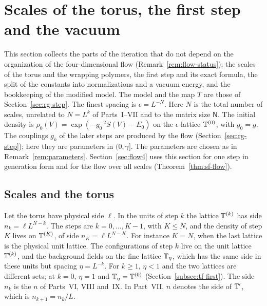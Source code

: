 \section{Scales of the torus, the first step and the vacuum}\label{sec:target-flow}

This section collects the parts of the iteration that do not depend on the organization of the four-dimensional flow (Remark~\ref{rem:flow-status}): the scales of the torus and the wrapping polymers, the first step and its exact formula, the split of the constants into normalizations and a vacuum energy, and the bookkeeping of the modified model. The model and the map $T$ are those of Section~\ref{sec:rg-step}. The finest spacing is $\epsilon=L^{-N}$. Here $N$ is the total number of scales, unrelated to $N=L^k$ of Parts~I--VII and to the matrix size $\mathsf N$. The initial density is $\rho_0(V)=\exp(-g_0^{-2}S(V)-E_0)$ on the $\epsilon$-lattice $\mathbb T^{(0)}$, with $g_0=g$. The couplings $g_k$ of the later steps are produced by the flow (Section~\ref{sec:rg-step}); here they are parameters in $(0,\gamma]$. The parameters are chosen as in Remark~\ref{rem:parameters}. Section~\ref{sec:flow4} uses this section for one step in generation form and for the flow over all scales (Theorem~\ref{thm:sf-flow}).

\subsection{Scales and the torus}\label{subsec:tf-scales}

Let the torus have physical side $\ell$. In the units of step $k$ the lattice $\mathbb T^{(k)}$ has side $n_k=\ell L^{N-k}$. The steps are $k=0,\dots,K-1$, with $K\le N$, and the density of step $K$ lives on $\mathbb T^{(K)}$, of side $n_K=\ell L^{N-K}$. For instance $K=N$, when the last lattice is the physical unit lattice. The configurations of step $k$ live on the unit lattice $\mathbb T^{(k)}$, and the background fields on the fine lattice $\mathbb T_\eta$, which has the same side in these units but spacing $\eta=L^{-k}$. For $k\ge1$, $\eta<1$ and the two lattices are different sets; at $k=0$, $\eta=1$ and $\mathbb T_\eta=\mathbb T^{(0)}$ (Section~\ref{subsec:tf-first}). The side $n_k$ is the $n$ of Parts~VI, VIII and~IX. In Part~VII, $n$ denotes the side of $\mathbb T'$, which is $n_{k+1}=n_k/L$.

